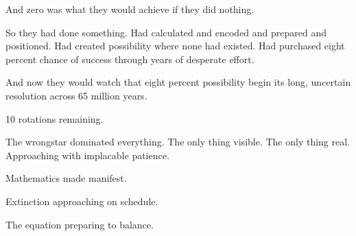 And zero was what they would achieve if they did nothing.

So they had done something. Had calculated and encoded and prepared and positioned. Had created possibility where none had existed. Had purchased eight percent chance of success through years of desperate effort.

And now they would watch that eight percent possibility begin its long, uncertain resolution across 65 million years.

10 rotations remaining.

The wrongstar dominated everything. The only thing visible. The only thing real. Approaching with implacable patience.

Mathematics made manifest.

Extinction approaching on schedule.

The equation preparing to balance.

